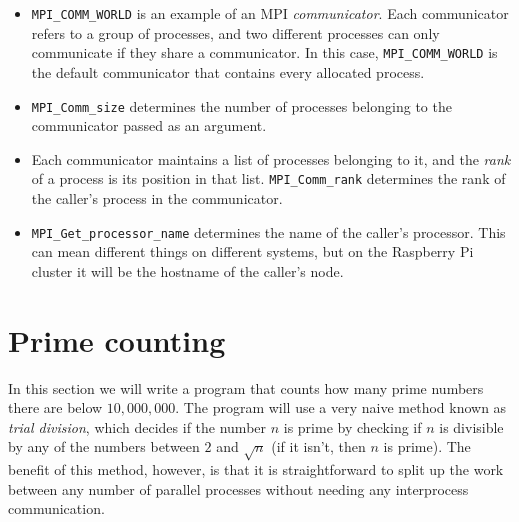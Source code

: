 \documentclass{article}
\begin{document}
\begin{itemize}
\begin{itemize}
        \item \texttt{MPI\_COMM\_WORLD} is an example of an MPI \emph{communicator}. Each communicator refers to a group of processes, and two different processes can only communicate if they share a communicator. In this case, \texttt{MPI\_COMM\_WORLD} is the default communicator that contains every allocated process.
        
        \item \texttt{MPI\_Comm\_size} determines the number of processes belonging to the communicator passed as an argument.
        
        \item Each communicator maintains a list of processes belonging to it, and the \emph{rank} of a process is its position in that list. \texttt{MPI\_Comm\_rank} determines the rank of the caller's process in the communicator. 
        
        \item \texttt{MPI\_Get\_processor\_name} determines the name of the caller's processor. This can mean different things on different systems, but on the Raspberry Pi cluster it will be the hostname of the caller's node.
    \end{itemize}
\end{itemize}

\section{Prime counting}

In this section we will write a program that counts how many prime numbers there are below $10,000,000$. The program will use a very naive method known as \emph{trial division}, which decides if the number $n$ is prime by checking if $n$ is divisible by any of the numbers between $2$ and $\sqrt{n}$ (if it isn't, then $n$ is prime). The benefit of this method, however, is that it is straightforward to split up the work between any number of parallel processes without needing any interprocess communication.
\end{document}
